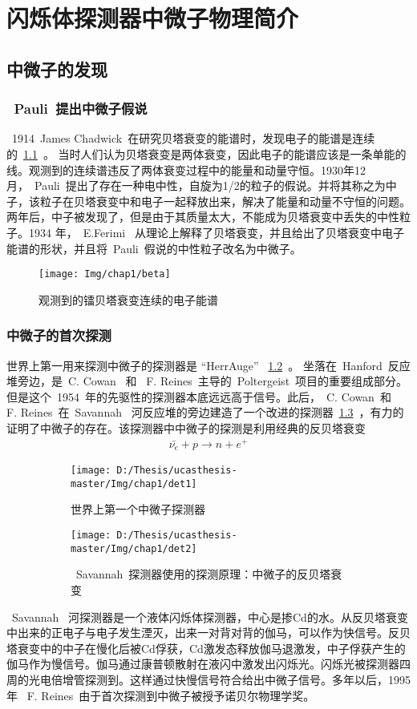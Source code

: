 
\chapter{闪烁体探测器中微子物理简介}
\label{chap:chap2}
\section{中微子的发现}
\subsection{~Pauli~提出中微子假说}
~1914~James Chadwick~在研究贝塔衰变的能谱时，发现电子的能谱是连续的~\ref{fig:beta}~。 当时人们认为贝塔衰变是两体衰变，因此电子的能谱应该是一条单能的线。观测到的连续谱违反了两体衰变过程中的能量和动量守恒。1930年12 月，~Pauli~提出了存在一种电中性，自旋为1/2的粒子的假说。并将其称之为中子，该粒子在贝塔衰变中和电子一起释放出来，解决了能量和动量不守恒的问题。两年后，中子被发现了，但是由于其质量太大，不能成为贝塔衰变中丢失的中性粒子。1934 年，~E.Ferimi~ 从理论上解释了贝塔衰变，并且给出了贝塔衰变中电子能谱的形状，并且将~Pauli~假说的中性粒子改名为中微子。
\begin{figure}[!htbp]
  \centering
   \texttt{[image: Img/chap1/beta]}
    \caption{观测到的镭贝塔衰变连续的电子能谱}
  \label{fig:beta}
\end{figure}
\subsection{中微子的首次探测}
世界上第一用来探测中微子的探测器是 “HerrAuge” ~\ref{fig:det_1}~。 坐落在~Hanford~反应堆旁边，是~C. Cowan~ 和~ F. Reines~主导的~Poltergeist~项目的重要组成部分。但是这个~1954~年的先驱性的探测器本底远远高于信号。此后，~C. Cowan~和~ F. Reines~在~Savannah~ 河反应堆的旁边建造了一个改进的探测器~\ref{fig:det_2}~，有力的证明了中微子的存在。该探测器中中微子的探测是利用经典的反贝塔衰变
\begin{eqnarray}\label{eq:ibd}
\bar{\nu_e} + p \rightarrow n + e^+
\end{eqnarray}
\begin{figure}[!htbp]
  \centering
  \begin{subfigure}[b]{\MySubFactor\textwidth}
    \texttt{[image: D:/Thesis/ucasthesis-master/Img/chap1/det1]}
    \caption{世界上第一个中微子探测器}
    \label{fig:det_1}
  \end{subfigure}%
  \quad\quad\quad\quad\quad\quad%
  \begin{subfigure}[b]{\MySubFactor\textwidth}
    \texttt{[image: D:/Thesis/ucasthesis-master/Img/chap1/det2]}
    \caption{~Savannah~探测器使用的探测原理：中微子的反贝塔衰变}
    \label{fig:det_2}
  \end{subfigure}
  \caption{ }
  \label{fig:det}
\end{figure}
~Savannah~ 河探测器是一个液体闪烁体探测器，中心是掺Cd的水。从反贝塔衰变中出来的正电子与电子发生湮灭，出来一对背对背的伽马，可以作为快信号。反贝塔衰变中的中子在慢化后被Cd俘获，Cd激发态释放伽马退激发，中子俘获产生的伽马作为慢信号。伽马通过康普顿散射在液闪中激发出闪烁光。闪烁光被探测器四周的光电倍增管探测到。这样通过快慢信号符合给出中微子信号。多年以后，1995 年 ~F. Reines~由于首次探测到中微子被授予诺贝尔物理学奖。
